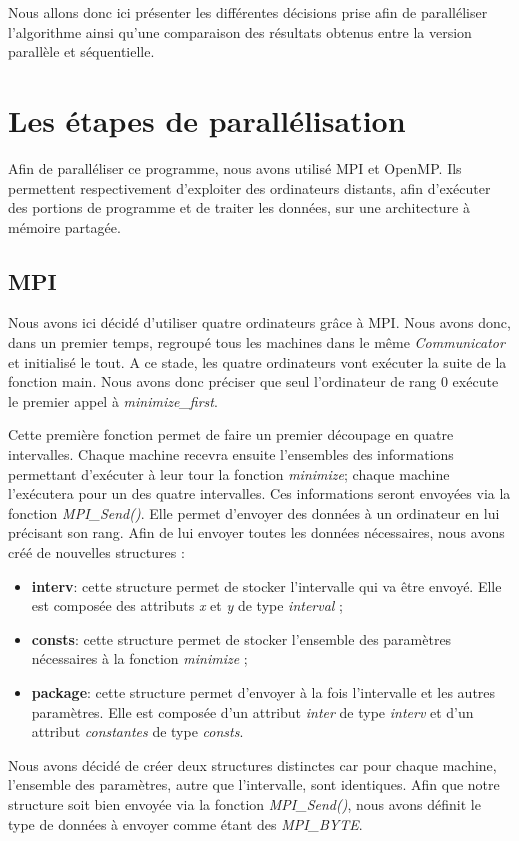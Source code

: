 \documentclass[a4paper,10pt]{article}
\begin{document}
Nous allons donc ici présenter les différentes décisions prise afin de paralléliser l'algorithme ainsi qu'une comparaison des résultats obtenus entre la version parallèle et séquentielle.

\newpage
\section{Les étapes de parallélisation}

Afin de paralléliser ce programme, nous avons utilisé MPI et OpenMP. Ils permettent respectivement d'exploiter des ordinateurs distants, afin d'exécuter des portions de programme et de traiter les données, sur une architecture à mémoire partagée. 

\subsection{MPI}
Nous avons ici décidé d'utiliser quatre ordinateurs grâce à MPI. Nous avons donc, dans un premier temps, regroupé tous les machines dans le même \emph{Communicator} et initialisé le tout. A ce stade, les quatre ordinateurs vont exécuter la suite de la fonction main. Nous avons donc préciser que seul l'ordinateur de rang 0 exécute le premier appel à \emph{minimize\_first}. 

Cette première fonction permet de faire un premier découpage en quatre intervalles. Chaque machine recevra ensuite l'ensembles des informations permettant d'exécuter à leur tour la fonction \emph{minimize}; chaque machine l'exécutera pour un des quatre intervalles. Ces informations seront envoyées via la fonction \emph{MPI\_Send()}. Elle permet d'envoyer des données à un ordinateur en lui précisant son rang. Afin de lui envoyer toutes les données nécessaires, nous avons créé de nouvelles structures : 
\begin{itemize}
\item \textbf{interv}: cette structure permet de stocker l'intervalle qui va être envoyé. Elle est composée des attributs \emph{x} et \emph{y} de type \emph{interval} ; 
\item \textbf{consts}: cette structure permet de stocker l'ensemble des paramètres nécessaires à la fonction \emph{minimize} ; 
\item \textbf{package}: cette structure permet d'envoyer à la fois l'intervalle et les autres paramètres. Elle est composée d'un attribut \emph{inter} de type \emph{interv} et d'un attribut \emph{constantes} de type \emph{consts}. 
\end{itemize}
Nous avons décidé de créer deux structures distinctes car pour chaque machine, l'ensemble des paramètres, autre que l'intervalle, sont identiques.
Afin que notre structure soit bien envoyée via la fonction \emph{MPI\_Send()}, nous avons définit le type de données à envoyer comme étant des \emph{MPI\_BYTE}.
\end{document}
